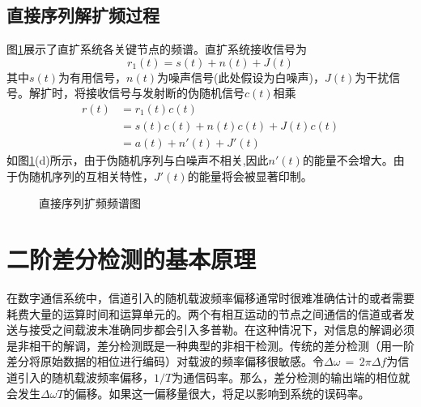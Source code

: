 \subsection{直接序列解扩频过程}
图\ref{fig:ddcode:dsssspec}展示了直扩系统各关键节点的频谱。直扩系统接收信号为
\begin{equation}
r_1(t)=s(t)+n(t)+J(t)
\end{equation}
其中$s(t)$为有用信号，$n(t)$为噪声信号(此处假设为白噪声)，$J(t)$为干扰信号。解扩时，将接收信号与发射断的伪随机信号$c(t)$相乘
\begin{equation}
\begin{split}
	r(t)&=r_1(t)c(t)\\
		&=s(t)c(t)+n(t)c(t)+J(t)c(t) \\
		&=a(t)+n'(t)+J'(t)
\end{split}
\end{equation}
如图\ref{fig:ddcode:dsssspec}(d)所示，由于伪随机序列与白噪声不相关,因此$n'(t)$的能量不会增大。由于伪随机序列的互相关特性，$J'(t)$的能量将会被显著印制。
\begin{figure}[htbp]
	\centering
	\begin{minipage}{0.3\textwidth}
		\centering
		\subfigure[原始信号频谱]{
			
			}
	\end{minipage}	
	\begin{minipage}{0.3\textwidth}
		\centering
		\subfigure[扩频后信号频谱]{
			
		}
	\end{minipage}
	\begin{minipage}{0.3\textwidth}
		\centering
		\subfigure[通过信道后的频谱]{
			
		}
	\end{minipage}
	\begin{minipage}{0.3\textwidth}
		\centering
		\subfigure[解扩后的频谱]{
			
		}
		\label{fig:ddcode:dsssspec:c}
	\end{minipage}
	\caption{直接序列扩频频谱图}
	\label{fig:ddcode:dsssspec}
\end{figure}


\section{二阶差分检测的基本原理}
	在数字通信系统中，信道引入的随机载波频率偏移通常时很难准确估计的或者需要耗费大量的运算时间和运算单元的。两个有相互运动的节点之间通信的信道或者发送与接受之间载波未准确同步都会引入多普勒。在这种情况下，对信息的解调必须是非相干的解调，差分检测既是一种典型的非相干检测。传统的差分检测（用一阶差分将原始数据的相位进行编码）对载波的频率偏移很敏感。令$\Delta\omega\,=\,2\pi \Delta f $为信道引入的随机载波频率偏移，$1/T$为通信码率。那么，差分检测的输出端的相位就会发生$\Delta\omega T $的偏移。如果这一偏移量很大，将足以影响到系统的误码率。
	
